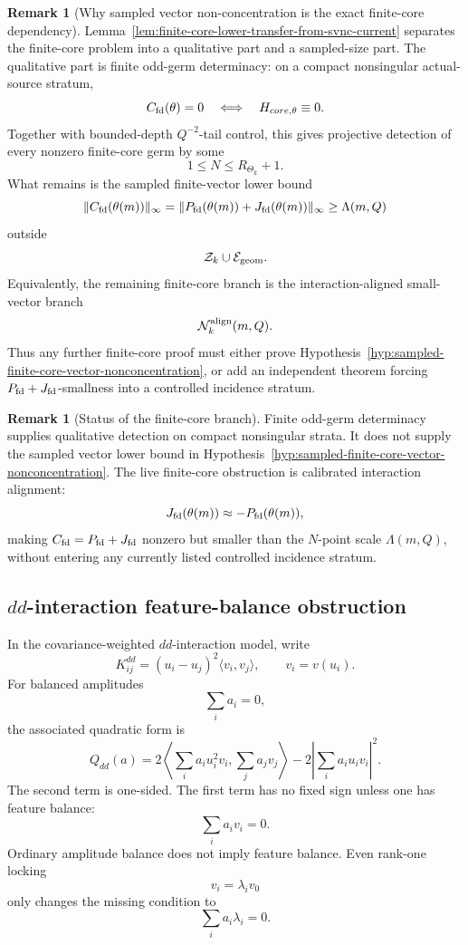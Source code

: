 \documentclass[11pt,a4paper]{amsart}
\def\core{core}%
\theoremstyle{plain}
\theoremstyle{definition}
\newtheorem{remark}[theorem]{Remark}
\newcommand{\core}{\mathrm{core}}
\begin{document}
\begin{remark}[Why sampled vector non-concentration is the exact finite-core dependency]
\label{rem:why-svnc-is-exact-finite-core-dependency}
Lemma~\ref{lem:finite-core-lower-transfer-from-svnc-current} separates the
finite-core problem into a qualitative part and a sampled-size part.  The
qualitative part is finite odd-germ determinacy: on a compact nonsingular
actual-source stratum,
\[
C_{\rm fd}(\theta)=0
\quad\Longleftrightarrow\quad
H_{\core,\theta}\equiv0.
\]
Together with bounded-depth \(Q^{-2}\)-tail control, this gives projective
detection of every nonzero finite-core germ by some
\[
1\le N\le R_{\Theta_k}+1.
\]
What remains is the sampled finite-vector lower bound
\[
\|C_{\rm fd}(\theta(m))\|_\infty
=
\|P_{\rm fd}(\theta(m))+J_{\rm fd}(\theta(m))\|_\infty
\ge
\Lambda(m,Q)
\]
outside
\[
\mathcal Z_k\cup\mathcal E_{\rm geom}.
\]
Equivalently, the remaining finite-core branch is the interaction-aligned
small-vector branch
\[
\mathcal N_k^{\rm align}(m,Q).
\]
Thus any further finite-core proof must either prove
Hypothesis~\ref{hyp:sampled-finite-core-vector-nonconcentration}, or add an
independent theorem forcing \(P_{\rm fd}+J_{\rm fd}\)-smallness into a
controlled incidence stratum.
\end{remark}

\begin{remark}[Status of the finite-core branch]
\label{rem:status-finite-core-branch-current}
Finite odd-germ determinacy supplies qualitative detection on compact
nonsingular strata.  It does not supply the sampled vector lower bound in
Hypothesis~\ref{hyp:sampled-finite-core-vector-nonconcentration}.  The
live finite-core obstruction is calibrated interaction alignment:
\[
J_{\rm fd}(\theta(m))\approx -P_{\rm fd}(\theta(m)),
\]
making \(C_{\rm fd}=P_{\rm fd}+J_{\rm fd}\) nonzero but smaller than the
\(N\)-point scale \(\Lambda(m,Q)\), without entering any currently listed
controlled incidence stratum.
\end{remark}

\subsection{\(dd\)-interaction feature-balance obstruction}
\label{subsec:dd-interaction-feature-balance-obstruction}

In the covariance-weighted \(dd\)-interaction model, write
\[
K_{ij}^{dd}
=
(u_i-u_j)^2\langle v_i,v_j\rangle,
\qquad
v_i=v(u_i).
\]
For balanced amplitudes
\[
\sum_i a_i=0,
\]
the associated quadratic form is
\[
Q_{dd}(a)
=
2\left\langle
\sum_i a_i u_i^2v_i,\sum_j a_jv_j
\right\rangle
-
2\left|
\sum_i a_i u_iv_i
\right|^2.
\]
The second term is one-sided.  The first term has no fixed sign unless one has
feature balance:
\[
\sum_i a_iv_i=0.
\]
Ordinary amplitude balance does not imply feature balance.  Even rank-one
locking
\[
v_i=\lambda_i v_0
\]
only changes the missing condition to
\[
\sum_i a_i\lambda_i=0.
\]
\end{document}
